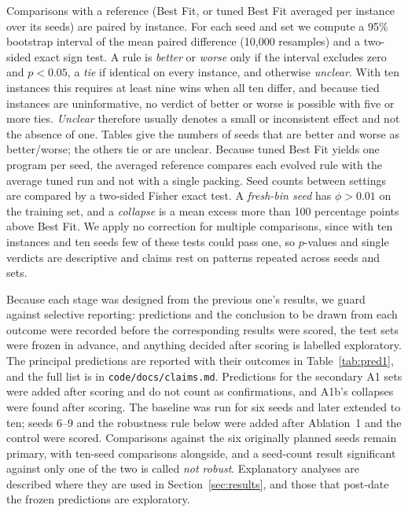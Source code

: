 \documentclass[10pt,twocolumn]{article}
\begin{document}
Comparisons with a reference (Best Fit, or tuned Best Fit averaged per instance over its seeds) are paired by instance. For each seed and set we compute a 95\% bootstrap interval of the mean paired difference (10,000 resamples) and a two-sided exact sign test. A rule is \emph{better} or \emph{worse} only if the interval excludes zero and $p<0.05$, a \emph{tie} if identical on every instance, and otherwise \emph{unclear}. With ten instances this requires at least nine wins when all ten differ, and because tied instances are uninformative, no verdict of better or worse is possible with five or more ties. \emph{Unclear} therefore usually denotes a small or inconsistent effect and not the absence of one. Tables give the numbers of seeds that are better and worse as better/worse; the others tie or are unclear. Because tuned Best Fit yields one program per seed, the averaged reference compares each evolved rule with the average tuned run and not with a single packing. Seed counts between settings are compared by a two-sided Fisher exact test. A \emph{fresh-bin seed} has $\phi>0.01$ on the training set, and a \emph{collapse} is a mean excess more than 100 percentage points above Best Fit. We apply no correction for multiple comparisons, since with ten instances and ten seeds few of these tests could pass one, so $p$-values and single verdicts are descriptive and claims rest on patterns repeated across seeds and sets.

Because each stage was designed from the previous one's results, we guard against selective reporting: predictions and the conclusion to be drawn from each outcome were recorded before the corresponding results were scored, the test sets were frozen in advance, and anything decided after scoring is labelled exploratory. The principal predictions are reported with their outcomes in Table~\ref{tab:pred1}, and the full list is in \texttt{code/docs/claims.md}. Predictions for the secondary A1 sets were added after scoring and do not count as confirmations, and A1b's collapses were found after scoring. The baseline was run for six seeds and later extended to ten; seeds 6--9 and the robustness rule below were added after Ablation~1 and the control were scored. Comparisons against the six originally planned seeds remain primary, with ten-seed comparisons alongside, and a seed-count result significant against only one of the two is called \emph{not robust}. Explanatory analyses are described where they are used in Section~\ref{sec:results}, and those that post-date the frozen predictions are exploratory.
\end{document}
